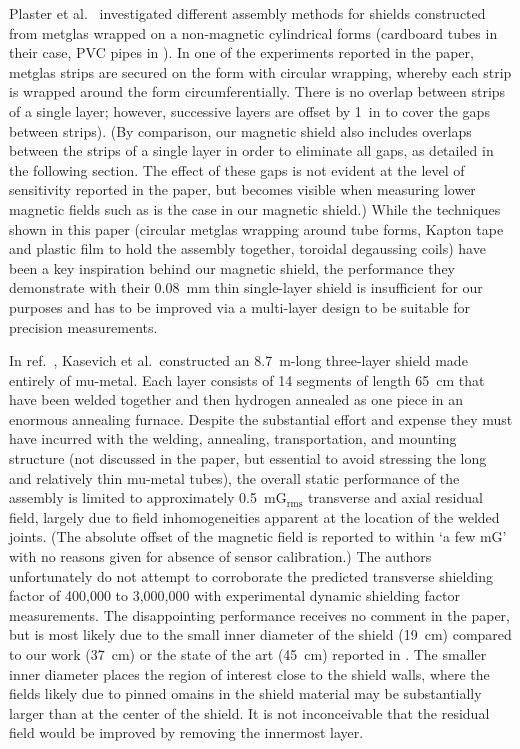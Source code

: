 Plaster et al.\ \cite{malkowski2011technique} investigated different assembly
methods for shields constructed from metglas wrapped on a non-magnetic
cylindrical forms (cardboard tubes in their case, PVC pipes in \CENTREX). In
one of the experiments reported in the paper, metglas strips are secured on the
form with circular wrapping, whereby each strip is wrapped around the form
circumferentially. There is no overlap between strips of a single layer;
however, successive layers are offset by 1~in to cover the gaps between strips).
(By comparison, our magnetic shield also includes overlaps between the strips of a
single layer in order to eliminate all gaps, as detailed in the following
section. The effect of these gaps is not evident at the level of sensitivity
reported in the paper, but becomes visible when measuring lower magnetic fields
such as is the case in our magnetic shield.) While the techniques shown in this
paper (circular metglas wrapping around tube forms, Kapton tape and plastic film
to hold the assembly together, toroidal degaussing coils) have been a key
inspiration behind our magnetic shield, the performance they demonstrate with
their 0.08~mm thin single-layer shield is insufficient for our purposes and has
to be improved via a multi-layer design to be suitable for precision
measurements.

In ref.\ \cite{dickerson2012high}, Kasevich et al.\ constructed an 8.7~m-long
three-layer shield made entirely of mu-metal. Each layer consists of 14 segments
of length 65~cm that have been welded together and then hydrogen annealed as one
piece in an enormous annealing furnace. Despite the substantial effort and
expense they must have incurred with the welding, annealing, transportation, and
mounting structure (not discussed in the paper, but essential to avoid stressing
the long and relatively thin mu-metal tubes), the overall static performance of
the assembly is limited to approximately 0.5~mG$_\text{rms}$ transverse and
axial residual field, largely due to field inhomogeneities apparent at the
location of the welded joints. (The absolute offset of the magnetic field is
reported to within `a few mG' with no reasons given for absence of sensor
calibration.) The authors unfortunately do not attempt to corroborate the
predicted transverse shielding factor of 400,000 to 3,000,000 with experimental
dynamic shielding factor measurements. The disappointing performance receives
no comment in the paper, but is most likely due to the small inner diameter of
the shield (19~cm) compared to our work (37~cm) or the state of the art (45~cm)
reported in \cite{wodey2020scalable}. The smaller inner diameter places the
region of interest close to the shield walls, where the fields likely due to
pinned omains in the shield material may be substantially larger than at the
center of the shield. It is not inconceivable that the residual field would be
improved by removing the innermost layer. 


